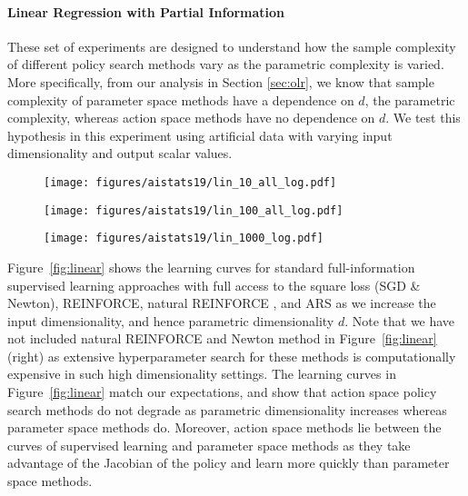 \paragraph{Linear Regression with Partial Information} These set of experiments are designed to understand how the sample
complexity of different policy search methods vary as the parametric
complexity is varied. More specifically, from our analysis in Section \ref{sec:olr}, we know
that sample complexity of parameter space methods have a dependence on
$d$, the parametric complexity, whereas action space methods have no
dependence on $d$. We test this hypothesis in this experiment using artificial data
with varying input dimensionality and output scalar values.
%
%
%
%
%
%
\begin{figure*}[t]
  \centering
  \begin{subfigure}{0.32\linewidth}
    \texttt{[image: figures/aistats19/lin\_10\_all\_log.pdf]}\label{fig:lin10}
\end{subfigure}
\begin{subfigure}{0.32\linewidth}
  \texttt{[image: figures/aistats19/lin\_100\_all\_log.pdf]}\label{fig:lin100}
\end{subfigure}
\begin{subfigure}{0.32\linewidth}
  \texttt{[image: figures/aistats19/lin\_1000\_log.pdf]}\label{fig:lin1000}
\end{subfigure}
  \caption{Linear Regression Experiments with varying input
    dimensionality}
  \label{fig:linear}
\end{figure*}
Figure~\ref{fig:linear} shows the learning curves for standard full-information
supervised learning approaches with full access to the square loss (SGD \& Newton), REINFORCE, natural REINFORCE
\citep{kakade2002natural}, and ARS as we increase the 
input dimensionality, and hence parametric dimensionality $d$. 
%
%
%
Note that we have not included natural REINFORCE and Newton method in
Figure~\ref{fig:linear} (right) as extensive hyperparameter search for these methods is computationally expensive in such high dimensionality settings.
The learning curves in Figure~\ref{fig:linear}
match our expectations, and show that action space policy
search methods do not degrade as parametric dimensionality increases
whereas parameter space methods do. Moreover, action space methods lie
between the curves of supervised learning and parameter space
methods as they take advantage of the Jacobian of the policy and
learn  more quickly than parameter space methods.



